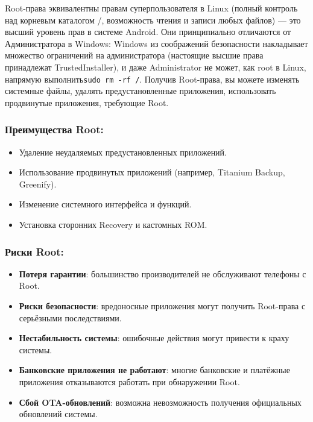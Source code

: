 
Root-права эквивалентны правам суперпользователя в Linux (полный контроль над корневым каталогом /, возможность чтения и записи любых файлов) — это высший уровень прав в системе Android. Они принципиально отличаются от Администратора в Windows: Windows из соображений безопасности накладывает множество ограничений на администратора (настоящие высшие права принадлежат TrustedInstaller), и даже Administrator не может, как root в Linux, напрямую выполнить\texttt{sudo rm -\allowbreak rf /\allowbreak *}. Получив Root-права, вы можете изменять системные файлы, удалять предустановленные приложения, использовать продвинутые приложения, требующие Root.

\subsubsection*{Преимущества Root:}

\begin{itemize}
  \item Удаление неудаляемых предустановленных приложений.
  \item Использование продвинутых приложений (например, Titanium Backup, Greenify).
  \item Изменение системного интерфейса и функций.
  \item Установка сторонних Recovery и кастомных ROM.
\end{itemize}

\subsubsection*{Риски Root:}

\begin{itemize}
  \item \textbf{Потеря гарантии}: большинство производителей не обслуживают телефоны с Root.
  \item \textbf{Риски безопасности}: вредоносные приложения могут получить Root-права с серьёзными последствиями.
  \item \textbf{Нестабильность системы}: ошибочные действия могут привести к краху системы.
  \item \textbf{Банковские приложения не работают}: многие банковские и платёжные приложения отказываются работать при обнаружении Root.
  \item \textbf{Сбой OTA-обновлений}: возможна невозможность получения официальных обновлений системы.
\end{itemize}

